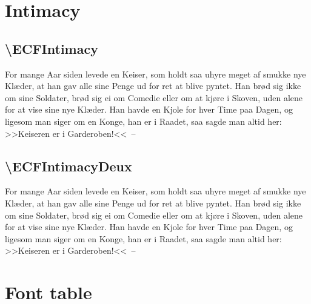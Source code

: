 \documentclass[danish,a4paper,11pt]{scrartcl}
\begin{document}
\section*{Intimacy}
\subsection*{\textbackslash ECFIntimacy}
\normalfont\ECFIntimacy
  For mange Aar siden levede en Keiser, som holdt saa uhyre meget af
   smukke nye Kl\ae der, at han gav alle sine Penge ud for ret at blive
   pyntet. Han br\o d sig ikke om sine Soldater, br\o d sig ei om
   Comedie eller om at kj\o re i Skoven, uden alene for at vise sine
   nye Kl\ae der. Han havde en Kjole for hver Time paa Dagen, og
   ligesom man siger om en Konge, han er i Raadet, saa sagde man altid
   her: >>Keiseren er i Garderoben!<<~--

\subsection*{\textbackslash ECFIntimacyDeux}
\normalfont\ECFIntimacyDeux
  For mange Aar siden levede en Keiser, som holdt saa uhyre meget af
   smukke nye Kl\ae der, at han gav alle sine Penge ud for ret at blive
   pyntet. Han br\o d sig ikke om sine Soldater, br\o d sig ei om
   Comedie eller om at kj\o re i Skoven, uden alene for at vise sine
   nye Kl\ae der. Han havde en Kjole for hver Time paa Dagen, og
   ligesom man siger om en Konge, han er i Raadet, saa sagde man altid
   her: >>Keiseren er i Garderoben!<<~--

\newpage
\normalfont\ECFIntimacy
\section*{Font table}
 \def\tfont{\usefont{T1}{fve}{m}{n}\selectfont}
 \newcount\currchar
 \def\showchar{\makebox[.09\linewidth]{\strut\char\currchar\hfill\tfont\tiny\the\currchar}
   \global\advance\currchar1}
 
\end{document}

